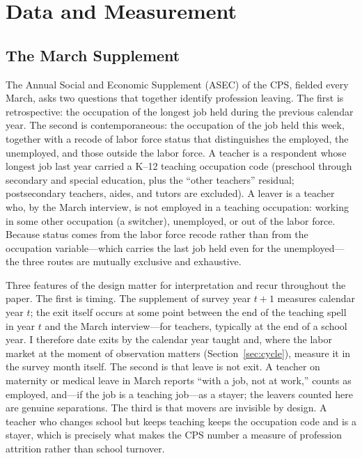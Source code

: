 \documentclass[11pt,a4paper]{article}
\begin{document}
\section{Data and Measurement}\label{sec:data}

\subsection{The March Supplement}

The Annual Social and Economic Supplement (ASEC) of the CPS, fielded
every March, asks two questions that together identify profession
leaving. The first is retrospective: the occupation of the longest job
held during the previous calendar year. The second is contemporaneous:
the occupation of the job held this week, together with a recode of
labor force status that distinguishes the employed, the unemployed,
and those outside the labor force. A teacher is a respondent whose
longest job last year carried a K--12 teaching occupation code
(preschool through secondary and special education, plus the ``other
teachers'' residual; postsecondary teachers, aides, and tutors are
excluded). A leaver is a teacher who, by the March interview, is not
employed in a teaching occupation: working in some other occupation
(a switcher), unemployed, or out of the labor force. Because status
comes from the labor force recode rather than from the occupation
variable---which carries the last job held even for the
unemployed---the three routes are mutually exclusive and exhaustive.

Three features of the design matter for interpretation and recur
throughout the paper. The first is timing. The supplement of survey
year $t{+}1$ measures calendar year $t$; the exit itself occurs at
some point between the end of the teaching spell in year $t$ and the
March interview---for teachers, typically at the end of a school year.
I therefore date exits by the calendar year taught and, where the
labor market at the moment of observation matters
(Section~\ref{sec:cycle}), measure it in the survey month itself. The
second is that leave is not exit. A teacher on maternity or medical
leave in March reports ``with a job, not at work,'' counts as
employed, and---if the job is a teaching job---as a stayer; the
leavers counted here are genuine separations. The third is that movers
are invisible by design. A teacher who changes school but keeps
teaching keeps the occupation code and is a stayer, which is precisely
what makes the CPS number a measure of profession attrition rather
than school turnover.
\end{document}
